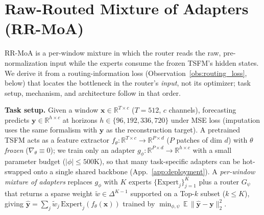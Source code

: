 \documentclass{article}
\begin{document}
\section{Raw-Routed Mixture of Adapters (RR-MoA)}
\label{sec:method}

RR-MoA is a per-window mixture in which the router reads the raw, pre-normalization input while the experts consume the frozen TSFM's hidden states. We derive it from a routing-information loss (Observation~\ref{obs:routing_loss}, below) that locates the bottleneck in the router's \emph{input}, not its optimizer; task setup, mechanism, and architecture follow in that order.

\textbf{Task setup.} Given a window $\mathbf{x}\in\mathbb{R}^{T\times c}$ ($T{=}512$, $c$ channels), forecasting predicts $\mathbf{y}\in\mathbb{R}^{h\times c}$ at horizons $h\in\{96,192,336,720\}$ under MSE loss (imputation uses the same formalism with $\mathbf{y}$ as the reconstruction target). A pretrained TSFM acts as a feature extractor $f_\theta:\mathbb{R}^{T\times c}\to\mathbb{R}^{P\times d}$ ($P$ patches of dim $d$) with $\theta$ \emph{frozen} ($\nabla_\theta\!\equiv\!0$); we train only an adapter $g_\phi:\mathbb{R}^{P\times d}\to\mathbb{R}^{h\times c}$ with a small parameter budget ($|\phi|\leq 500$K), so that many task-specific adapters can be hot-swapped onto a single shared backbone (App.~\ref{app:deployment}). A \emph{per-window mixture of adapters} replaces $g_\phi$ with $K$ experts $\{\mathrm{Expert}_j\}_{j=1}^K$ plus a router $G_\psi$ that returns a sparse weight $\widetilde{w}\in\Delta^{K-1}$ supported on a Top-$k$ subset ($k\leq K$), giving $\hat{\mathbf{y}}=\sum_{j} \widetilde{w}_j\,\mathrm{Expert}_j(f_\theta(\mathbf{x}))$ trained by $\min_{\phi,\psi}\,\mathbb{E}\,\|\hat{\mathbf{y}}-\mathbf{y}\|_2^2$.
\end{document}
